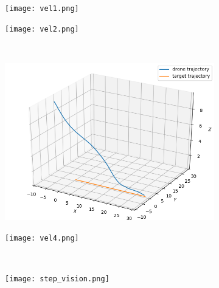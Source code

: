 \documentclass[conf]{new-aiaa}
\begin{document}
\begin{figure}[H]
  \begin{subfigure}{0.5\textwidth}
    \texttt{[image: vel1.png]}
    \caption{} \label{fig:vel1}
  \end{subfigure}%
  \hspace*{\fill}   %
  \begin{subfigure}{0.5\textwidth}
    \texttt{[image: vel2.png]}
    \caption{} \label{fig:vel2}
  \end{subfigure}%
  \hspace*{\fill}   %
  \\
  \begin{subfigure}{0.5\textwidth}
    \includegraphics[width=\linewidth]{vel3.png}
    \caption{} \label{fig:vel3}
  \end{subfigure}%
  \hspace*{\fill}   %
  \begin{subfigure}{0.5\textwidth}
    \texttt{[image: vel4.png]}
    \caption{} \label{fig:vel4}
  \end{subfigure}%
  \hspace*{\fill}   %
  \\
  \begin{subfigure}{0.5\textwidth}
    \texttt{[image: step\_vision.png]}
    \caption{} \label{fig:step_vision}
  \end{subfigure}%
  \hspace*{\fill}   %

\end{figure}
\end{document}
